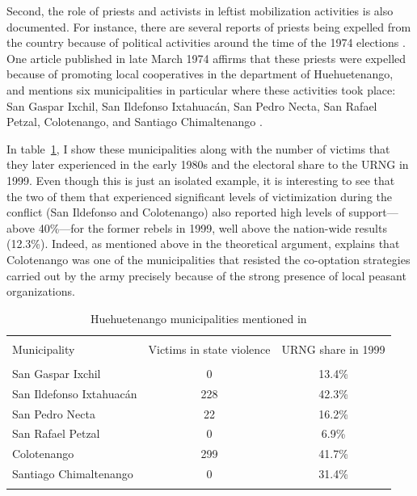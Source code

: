 \documentclass[12pt, notitlepage]{article}
\begin{document}

Second, the role of priests and activists in leftist mobilization activities is also documented.
For instance, there are several reports of priests being expelled from the country because of political activities around the time of the 1974 elections \citep{Imparcial:1974ab, Imparcial:1974uz}.
One article published in late March 1974 affirms that these priests were expelled because of promoting local cooperatives in the department of Huehuetenango, and mentions six municipalities in particular where these activities took place: San Gaspar Ixchil, San Ildefonso Ixtahuacán, San Pedro Necta, San Rafael Petzal, Colotenango, and Santiago Chimaltenango \citep{Imparcial:1974aa}.

In table~\ref{tab:6muni}, I show these municipalities along with the number of victims that they later experienced in the early 1980s and the electoral share to the URNG in 1999.
Even though this is just an isolated example, it is interesting to see that the two of them that experienced significant levels of victimization during the conflict (San Ildefonso and Colotenango) also reported high levels of support---above 40\%---for the former rebels in 1999, well above the nation-wide results (12.3\%).
Indeed, as mentioned above in the theoretical argument, \citet[223--226]{Kobrak:2013aa} explains that Colotenango was one of the municipalities that resisted the co-optation strategies carried out by the army precisely because of the strong presence of local peasant organizations.

\begin{table}[!htbp] \centering
  \caption{Huehuetenango municipalities mentioned in \citet{Imparcial:1974aa}}\label{tab:6muni}
  \small

  \begin{tabular}{lcc}
  \\[-1.8ex]\hline
  \hline \\[-1.8ex]
  Municipality & Victims in state violence & URNG share in 1999  \\
  \hline \\[-1.8ex]
  San Gaspar Ixchil & 0 & 13.4\% \\
  San Ildefonso Ixtahuacán & 228 & 42.3\% \\
  San Pedro Necta & 22 & 16.2\% \\
  San Rafael Petzal & 0 & 6.9\% \\
  Colotenango & 299 & 41.7\% \\
  Santiago Chimaltenango & 0 & 31.4\% \\
  \hline
  \hline \\[-1.8ex]
  \end{tabular}

\end{table}
\end{document}
